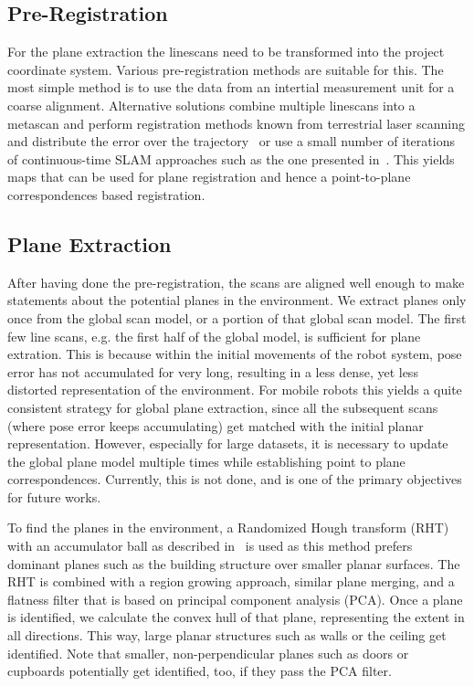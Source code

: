 \subsection{Pre-Registration}

For the plane extraction the linescans need to be transformed into the project coordinate system.
Various pre-registration methods are suitable for this.
The most simple method is to use the data from an intertial measurement unit for a coarse alignment.
Alternative solutions combine multiple linescans into a metascan and perform registration methods known from terrestrial laser scanning and distribute the error over the trajectory~\cite{Stoyanov2009,Bosse2009} or use a small number of iterations of continuous-time SLAM approaches such as the one presented in~\cite{REMSEN2013}.
This yields maps that can be used for plane registration and hence a point-to-plane correspondences based registration.

\subsection{Plane Extraction}

After having done the pre-registration, the scans are aligned well enough to make statements about the potential planes in the environment.
We extract planes only once from the global scan model, or a portion of that global scan model.
The first few line scans, e.g. the first half of the global model, is sufficient for plane extration.
This is because within the initial movements of the robot system, pose error has not accumulated for very long, resulting in a less dense, yet less distorted representation of the environment.
For mobile robots this yields a quite consistent strategy for global plane extraction, since all the subsequent scans (where pose error keeps accumulating) get matched with the initial planar representation.
However, especially for large datasets, it is necessary to update the global plane model multiple times while establishing point to plane correspondences.  
Currently, this is not done, and is one of the primary objectives for future works.

To find the planes in the environment, a Randomized Hough transform (RHT) with an accumulator ball as described in~\cite{3DRESEARCH2011} is used as this method prefers dominant planes such as the building structure over smaller planar surfaces.
The RHT is combined with a region growing approach, similar plane merging, and a flatness filter that is based on principal component analysis (PCA).
Once a plane is identified, we calculate the convex hull of that plane, representing the extent in all directions. 
This way, large planar structures such as walls or the ceiling get identified.
Note that smaller, non-perpendicular planes such as doors or cupboards potentially get identified, too, if they pass the PCA filter.

